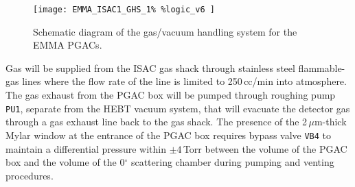 
\begin{figure}[t]
\centerline{
\texttt{[image: EMMA\_ISAC1\_GHS\_1\%
\%logic\_v6
]}
}
\caption{Schematic diagram of the gas/vacuum handling system for the EMMA PGACs.
}
\label{diagram}
\end{figure}

Gas will be supplied from the ISAC gas shack through stainless steel flammable-gas lines where the
flow rate of the line is limited to 250\,cc/min into atmosphere. The gas exhaust from the
PGAC box will be pumped through roughing pump \texttt{PU1}, separate from the HEBT vacuum system, that will evacuate the detector gas through a gas exhaust line back to the gas shack.
The presence of the 2\,$\mu$m-thick Mylar window at the entrance of the PGAC box requires bypass valve \texttt{VB4}
to maintain a differential pressure within $\pm 4$\,Torr between the volume of the PGAC box and the volume of  the 0$^\circ$ scattering chamber
during pumping and venting procedures.

